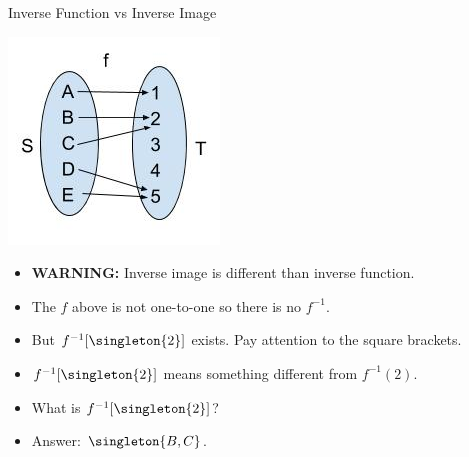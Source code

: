 \documentclass{beamer}
\begin{document}
\begin{frame}{Inverse Function vs Inverse Image}

\begin{center}
\includegraphics[scale=0.25]{function1}
\end{center}

\begin{itemize}
\item \textbf{WARNING:} Inverse image is different than inverse function.
\item The $f$ above is not one-to-one so there is no $f^{-1}$.
\item But $f^{-1}[\singleton{2}]$ exists. Pay attention to the square brackets.
\item $f^{-1}[\singleton{2}]$ means something different from $f^{-1}(2)$.
\item What is $f^{-1}[\singleton{2}]$?
\item Answer: $\singleton{B, C}$.
\end{itemize}

\end{frame}
\end{document}
